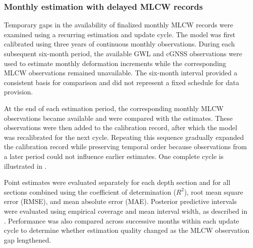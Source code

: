 \subsubsection{Monthly estimation with delayed MLCW records}
\label{subsec:delayed_evaluation}

Temporary gaps in the availability of finalized monthly MLCW records were examined using a recurring estimation and update cycle. The model was first calibrated using three years of continuous monthly observations. During each subsequent six-month period, the available GWL and cGNSS observations were used to estimate monthly deformation increments while the corresponding MLCW observations remained unavailable. The six-month interval provided a consistent basis for comparison and did not represent a fixed schedule for data provision.

At the end of each estimation period, the corresponding monthly MLCW observations became available and were compared with the estimates. These observations were then added to the calibration record, after which the model was recalibrated for the next cycle. Repeating this sequence gradually expanded the calibration record while preserving temporal order because observations from a later period could not influence earlier estimates. One complete cycle is illustrated in .

Point estimates were evaluated separately for each depth section and for all sections combined using the coefficient of determination ($R^2$), root mean square error (RMSE), and mean absolute error (MAE). Posterior predictive intervals were evaluated using empirical coverage and mean interval width, as described in . Performance was also compared across successive months within each update cycle to determine whether estimation quality changed as the MLCW observation gap lengthened.

